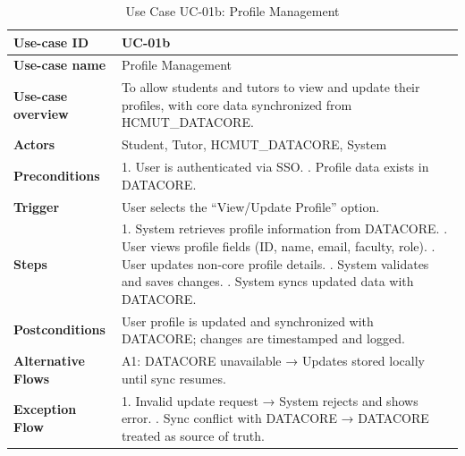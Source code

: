 \begin{table}[h!]
\centering
\begin{tabular}{|p{3cm}|p{11cm}|}
\hline
\textbf{Use-case ID} & UC-01b \\
\hline
\textbf{Use-case name} & Profile Management \\
\hline
\textbf{Use-case overview} & To allow students and tutors to view and update their profiles, with core data synchronized from HCMUT\_DATACORE. \\
\hline
\textbf{Actors} & Student, Tutor, HCMUT\_DATACORE, System \\
\hline
\textbf{Preconditions} & 
1. User is authenticated via SSO. \newline
2. Profile data exists in DATACORE. \\
\hline
\textbf{Trigger} & User selects the ``View/Update Profile'' option. \\
\hline
\textbf{Steps} & 
1. System retrieves profile information from DATACORE. \newline
2. User views profile fields (ID, name, email, faculty, role). \newline
3. User updates non-core profile details. \newline
4. System validates and saves changes. \newline
5. System syncs updated data with DATACORE. \\
\hline
\textbf{Postconditions} & User profile is updated and synchronized with DATACORE; changes are timestamped and logged. \\
\hline
\textbf{Alternative Flows} & 
A1: DATACORE unavailable → Updates stored locally until sync resumes. \\
\hline
\textbf{Exception Flow} & 
1. Invalid update request → System rejects and shows error. \newline
2. Sync conflict with DATACORE → DATACORE treated as source of truth. \\
\hline
\end{tabular}
\caption{Use Case UC-01b: Profile Management}
\end{table}

